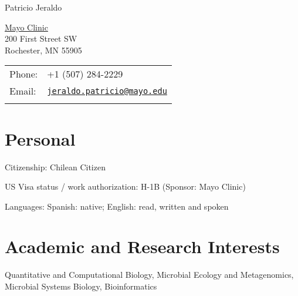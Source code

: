 \documentclass[letterpaper]{article}
\def\name{Patricio Jeraldo}
\renewenvironment{itemize}{
  \begin{list}{}{
    \setlength{\leftmargin}{1.5em}
  }
}{
  \end{list}
}
\begin{document}
{\huge \name}


\vspace{0.25in}

\begin{minipage}[t]{0.45\linewidth}
\vspace{0pt}
  \href{http://mayoclinic.org}{Mayo Clinic} \\
  200 First Street SW \\
  Rochester, MN 55905
\end{minipage}
\begin{minipage}[t]{0.45\linewidth}
\vspace{0pt}
  \begin{tabular}{ll}
    Phone: & +1 (507) 284-2229 \\
    Email: & \href{mailto:jeraldo.patricio@mayo.edu}{\tt jeraldo.patricio@mayo.edu} \\
    \\
  \end{tabular}
\end{minipage}


\section*{Personal}

\begin{itemize}
\item Citizenship: Chilean Citizen
\item US Visa status / work authorization: H-1B (Sponsor: Mayo Clinic)
\item Languages: Spanish: native; English: read, written and spoken
\end{itemize}

\section*{Academic and Research Interests}

\begin{itemize}
  \item Quantitative and Computational Biology, Microbial Ecology and
Metagenomics, Microbial Systems Biology, Bioinformatics
\end{itemize}
\end{document}
